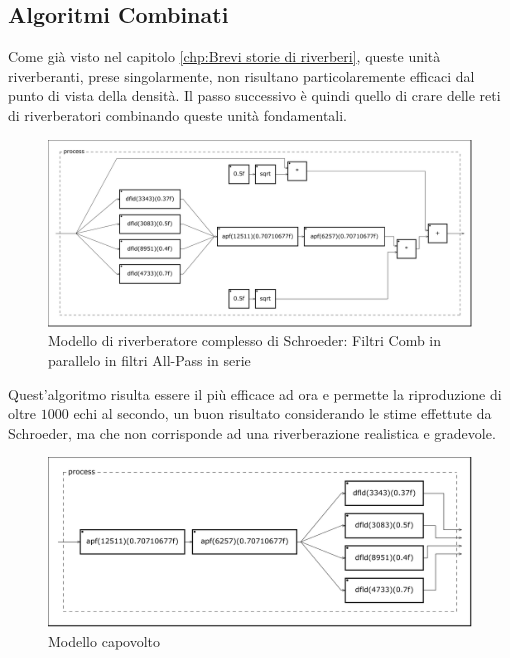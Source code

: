 \subsection{Algoritmi Combinati}

Come già visto nel capitolo \ref{chp:Brevi storie di riverberi}, 
queste unità riverberanti, prese singolarmente, non risultano particolaremente
efficaci dal punto di vista della densità. Il passo successivo è quindi quello
di crare delle reti di riverberatori combinando queste unità fondamentali.



\begin{figure}[htp]
\centering
\includegraphics[width=1\textwidth]{Code/mscombapf-svg/process.pdf}
\caption{Modello di riverberatore complesso di Schroeder: Filtri Comb in parallelo
         in filtri All-Pass in serie}
\label{fig:mscombapf}
\end{figure}

Quest'algoritmo risulta essere il più efficace ad ora e permette la
riproduzione di oltre $1000$ echi al secondo, un buon risultato considerando
le stime effettute da Schroeder, ma che non corrisponde ad una riverberazione
realistica e gradevole.




\begin{figure}[htp]
\centering
\includegraphics[width=1\textwidth]{Code/msapfcomb-svg/process.pdf}
\caption{Modello capovolto}
\label{fig:msapfcomb}
\end{figure}

